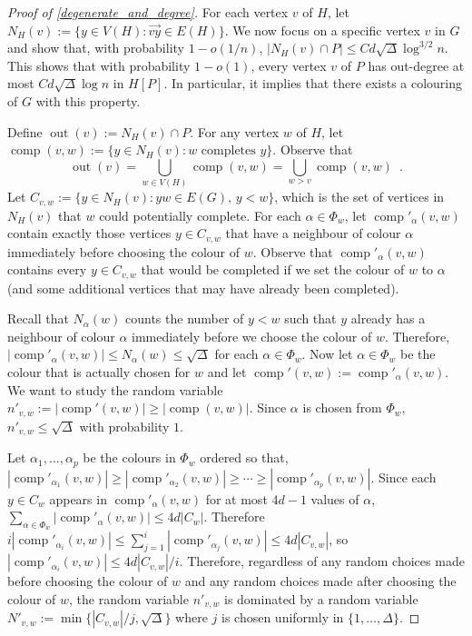 \documentclass{patmorin}
\DeclareMathOperator{\outn}{out}
\DeclareMathOperator{\comp}{comp}
\begin{document}
\begin{proof}[Proof of \cref{degenerate_and_degree}]
  For each vertex $v$ of $H$, let $N_H(v):=\{y\in V(H): \overrightarrow{vy}\in E(H)\}$.  We now focus on a specific vertex $v$ in $G$ and show that, with probability $1-o(1/n)$, $|N_H(v)\cap P|\le Cd\sqrt{\Delta}\log^{3/2} n$.  This shows that with probability $1-o(1)$, every vertex $v$ of $P$ has out-degree at most $Cd\sqrt{\Delta}\log n$ in $H[P]$.  In particular, it implies that there exists a colouring of $G$ with this property.

   Define $\outn(v):=N_H(v)\cap P$. For any vertex $w$ of $H$, let $\comp(v,w):=\{y\in N_H(v):\text{$w$ completes $y$}\}$.  Observe that
  \[
    \outn(v) = \bigcup_{w\in V(H)} \comp(v,w) = \bigcup_{w>v} \comp(v,w) \enspace .
  \]
  Let $C_{v,w}:=\{y\in N_H(v): yw\in E(G),\, y < w\}$, which is the set of vertices in $N_H(v)$ that $w$ could potentially complete.  For each $\alpha\in\Phi_w$, let $\comp'_\alpha(v,w)$ contain exactly those vertices $y\in C_{v,w}$ that have a neighbour of colour $\alpha$ immediately before choosing the colour of $w$.  Observe that $\comp'_\alpha(v,w)$ contains every $y\in C_{v,w}$ that would be completed if we set the colour of $w$ to $\alpha$ (and some additional vertices that may have already been completed).

  Recall that $N_\alpha(w)$ counts the number of $y < w$ such that $y$ already has a neighbour of colour $\alpha$ immediately before we choose the colour of $w$.  Therefore,  $|\comp'_\alpha(v,w)|\le N_\alpha(w)\le \sqrt{\Delta}$ for each $\alpha\in\Phi_w$.  Now let $\alpha\in\Phi_w$ be the colour that is actually chosen for $w$ and let $\comp'(v,w):=\comp'_\alpha(v,w)$.  We want to study the random variable $n'_{v,w}:=|\comp'(v,w)|\ge |\comp(v,w)|$.  Since $\alpha$ is chosen from $\Phi_w$, $n'_{v,w}\le\sqrt{\Delta}$ with probability $1$.



  Let $\alpha_1,\ldots,\alpha_p$ be the colours in $\Phi_w$ ordered so that, $|\comp'_{\alpha_1}(v,w)|\ge|\comp'_{\alpha_2}(v,w)|\ge\cdots\ge |\comp'_{\alpha_p}(v,w)|$.  Since each $y\in C_w$ appears in
  $\comp'_{\alpha}(v,w)$ for at most $4d-1$ values of $\alpha$,  $\sum_{\alpha\in\Phi_w} |\comp'_{\alpha}(v,w)| \le 4d|C_w|$.
  Therefore $i|\comp'_{\alpha_i}(v,w)|\le\sum_{j=1}^i|\comp'_{\alpha_j}(v,w)|\le 4d|C_{v,w}|$, so $|\comp'_{\alpha_i}(v,w)|\le 4d|C_{v,w}|/i$.    Therefore, regardless of any random choices made before choosing the colour of $w$ and any random choices made after choosing the colour of $w$, the random variable $n'_{v,w}$ is dominated by a random variable $N'_{v,w}:=\min\{|C_{v,w}|/j,\sqrt{\Delta}\}$ where $j$ is chosen uniformly in $\{1,\ldots,\Delta\}$.


\end{proof}
\end{document}

